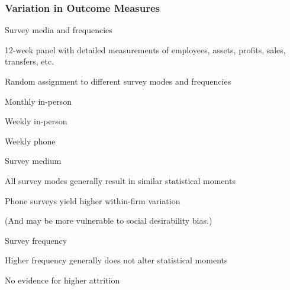 \documentclass[hideothersubsections, usenames,dvipsnames,11pt]{beamer}
\newenvironment{itemize_2pt}{\itemize\addtolength{\itemsep}{2pt}}{\enditemize}
\newenvironment{enumerate_2pt}{\enumerate\addtolength{\itemsep}{2pt}}{\endenumerate}
\begin{document}
\begin{frame}
\frametitle{Variation in Outcome Measures}

Survey media and frequencies \citep{Garlick2019}
\begin{itemize_2pt}
	\item 12-week panel with detailed measurements of employees, assets, profits, sales, transfers, etc.
	\item Random assignment to different survey modes and frequencies
	\begin{enumerate_2pt}
		\item Monthly in-person
		\item Weekly in-person
		\item Weekly phone
	\end{enumerate_2pt}
		
	\pause		
	
	\item Survey medium
	\begin{itemize_2pt}
		\item \textcolor{bdf}{All survey modes generally result in similar statistical moments}
		\item Phone surveys yield higher within-firm variation
		\item[] (And may be more vulnerable to social desirability bias.)
	\end{itemize_2pt}
	
	\item Survey frequency
	\begin{itemize_2pt}
		\item \textcolor{bdf}{Higher frequency generally does not alter statistical moments}
		\item No evidence for higher attrition
	\end{itemize_2pt}
\end{itemize_2pt}
\end{frame}



\end{document}
